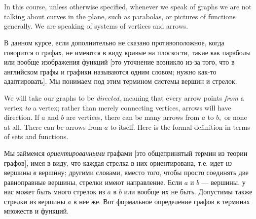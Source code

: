 \documentclass[../main/CT4S-EN-RU]{subfiles}
\begin{document}
\section{}\label{sec:graphs}

\begin{blockENG}
In this course, unless otherwise specified, whenever we speak of graphs we are not talking about curves in the plane, such as parabolas, or pictures of functions generally. We are speaking of systems of vertices and arrows.
\end{blockENG}

\begin{blockRUS}
В данном курсе, если дополнительно не сказано противоположное, когда говорится о графах, не имеются в виду кривые на плоскости, такие как параболы или вообще изображения функций [это уточнение возникло из-за того, что в английском графы и графики называются одним словом; нужно как-то адаптировать]. Мы понимаем под этим термином системы вершин и стрелок.
\end{blockRUS}

\begin{blockENG}
We will take our graphs to be {\em directed}, meaning that every arrow points {\em from} a vertex {\em to} a vertex; rather than merely connecting vertices, arrows will have direction. If $a$ and $b$ are vertices, there can be many arrows from $a$ to $b,$ or none at all. There can be arrows from $a$ to itself. Here is the formal definition in terms of sets and functions.
\end{blockENG}

\begin{blockRUS}
Мы займемся {\em ориентированными} графами [это общепринятый термин из теории графов], имея в виду, что каждая стрелка в них ориентирована, т.е. идет {\em из} вершины {\em в} вершину; другими словами, вместо того, чтобы просто соединять две равноправные вершины, стрелки имеют направление. Если $a$ и $b$ — вершины, у нас может быть много стрелок из $a$ в $b$ или вообще их не быть. Допустимы также стрелки из вершины $a$ в нее же. Вот формальное определение графов в терминах множеств и функций.
\end{blockRUS}


\subsection{}
\end{document}
